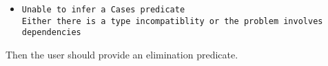 \begin{itemize}
  \begin{itemize}
  \item {\tt Unable to infer a Cases predicate\\
Either there is a type incompatiblity or the problem involves dependencies}
  \end{itemize}

  Then the user should provide an elimination predicate.








\end{itemize}

